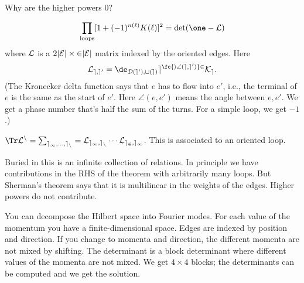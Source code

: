 Why are the higher powers 0? %

\begin{thm}[Sherman]
\[
\prod_{\text{loops}} [1+(-1)^{n(\ell)}K(\ell)]^2 = \det(\one - \cal L)
\]
where $\cal L$ is a $2|\cal E|\times 2|\cal E|$ matrix indexed by the oriented edges. Here 
\[
\cal L_{e,e'} = \de_{D(e'),t(e)} e^{\fc{i\angle(e,e')}2}K_e.
\]
(The Kronecker delta function says that $e$ has to flow into $e'$, i.e., the terminal of $e$ is the same as the start of $e'$. Here $\angle(e,e')$ means the angle between $e,e'$. We get a phase number that's half the sum of the turns. For a simple loop, we get $-1$.)
\end{thm}
$\Tr \cal L^n = \sum_{e_1,\ldots, e_n} = \cal L_{e_1,e_n}\cdots \cal L_{e_2,e_1}$. This is associated to an oriented loop.

Buried in this is an infinite collection of relations. In principle we have contributions in the RHS of the theorem with arbitrarily many loops. But Sherman's theorem says that it is multilinear in the weights of the edges. Higher powers do not contribute. 

You can decompose the Hilbert space into Fourier modes. For each value of the momentum you have a finite-dimensional space. Edges are indexed by position and direction. If you change to momenta and direction, the different momenta are not mixed by shifting. The determinant is a block determinant where different values of the momenta are not mixed. We get $4\times 4$ blocks; the determinants can be computed and we get the solution.